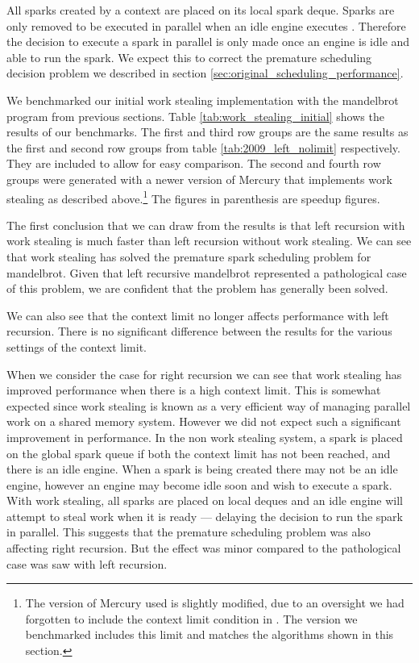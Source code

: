 All sparks created by a context are placed on its local spark deque.
Sparks are only removed to be executed in parallel when an idle engine
executes \trystealspark.
Therefore
the decision to execute a spark in parallel is only made once an engine is
idle and able to run the spark.
We expect this to correct the premature scheduling decision problem we
described in section \ref{sec:original_scheduling_performance}.



We benchmarked our initial work stealing implementation with the mandelbrot
program from previous sections.
Table \ref{tab:work_stealing_initial} shows the results of our benchmarks.
The first and third row groups are the same results as the first and second
row groups from table \ref{tab:2009_left_nolimit} respectively.
They are included to allow for easy comparison.
The second and fourth row groups were generated with a newer version of
Mercury that implements work stealing as described above.\footnote{
    The version of Mercury used is slightly modified,
    due to an oversight we had forgotten to include the context limit
    condition in \idle.
    The version we benchmarked includes this limit and matches the
    algorithms shown in this section.}
The figures in parenthesis are speedup figures.

The first conclusion that we can draw from the results is that
left recursion with work stealing is much faster than left recursion without
work stealing.
We can see that work stealing has solved the premature spark scheduling problem
for mandelbrot.
Given that left recursive mandelbrot represented a pathological case of this
problem,
we are confident that the problem has generally been solved.

We can also see that the context limit no longer affects performance
with left recursion.
There is no significant difference between the results for the various
settings of the context limit.

When we consider the case for right recursion we can see that
work stealing has improved performance when there is a 
high context limit.
This is somewhat expected since work stealing is known as a very
efficient way of managing parallel work on a shared memory system.
However we did not expect such a significant improvement in
performance.
In the non work stealing system,
a spark is placed on the global spark queue if both the context limit has
not been reached,
and there is an idle engine.
When a spark is being created there may not be an idle engine,
however an engine may become idle soon and wish to execute a spark.
With work stealing,
all sparks are placed on local deques and an idle
engine will attempt to steal work when it is ready ---
delaying the decision to run the spark in parallel.
This suggests that the premature scheduling problem was also affecting right
recursion.
But the effect was minor compared to the pathological case was saw with left
recursion.

